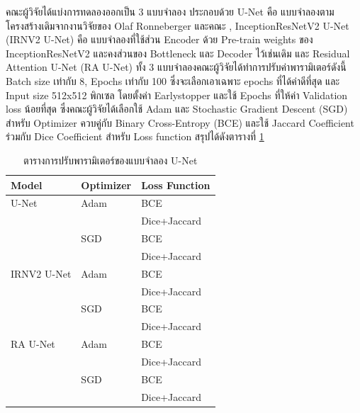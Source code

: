 \documentclass[12pt,oneside,openright,a4paper]{cpe-thai-project}
\begin{document}
\begin{itemize}[listparindent=\parindent]
คณะผู้วิจัยได้แบ่งการทดลองออกเป็น 3 แบบจำลอง ประกอบด้วย U-Net คือ แบบจำลองตามโครงสร้างเดิมจากงานวิจัยของ Olaf Ronneberger และคณะ \cite{unet-model}, InceptionResNetV2 U-Net (IRNV2 U-Net) คือ แบบจำลองที่ใช้ส่วน Encoder ด้วย Pre-train weights ของ InceptionResNetV2 และคงส่วนของ Bottleneck และ Decoder ไว้เช่นเดิม และ Residual Attention U-Net (RA U-Net) ทั้ง 3 แบบจำลองคณะผู้วิจัยได้ทำการปรับค่าพารามิเตอร์ดังนี้ Batch size เท่ากับ 8, Epochs เท่ากับ 100 ซึ่งจะเลือกเอาเฉพาะ epochs ที่ได้ค่าดีที่สุด และ Input size 512x512 พิกเซล โดยตั้งค่า Earlystopper และใช้ Epochs ที่ให้ค่า Validation loss น้อยที่สุด ซึ่งคณะผู้วิจัยได้เลือกใช้ Adam และ Stochastic Gradient Descent (SGD) สำหรับ Optimizer ควบคู่กับ Binary Cross-Entropy (BCE) และใช้ Jaccard Coefficient ร่วมกับ Dice Coefficient สำหรับ Loss function สรุปได้ดังตารางที่ \ref{tab:unetconf}

\begin{table}[!h]
    \centering
    \caption{ตารางการปรับพารามิเตอร์ของแบบจำลอง U-Net}
    \label{tab:unetconf}
    \begin{tabular}{>{\centering}p{}>{\centering}p{}>{\centering\arraybackslash}p{}}
\toprule
Model  & Optimizer & Loss Function\\ \midrule
 U-Net & Adam  & BCE  \\
 &  & Dice+Jaccard  \\
 & SGD & BCE  \\ 
 &  & Dice+Jaccard  \\ 
IRNV2 U-Net & Adam & BCE  \\ 
 &  & Dice+Jaccard  \\
 & SGD & BCE  \\ 
 &  & Dice+Jaccard  \\ 
 RA U-Net & Adam & BCE  \\ 
 &  & Dice+Jaccard  \\
 & SGD & BCE  \\ 
 &  & Dice+Jaccard  \\  \bottomrule
    \end{tabular}
\end{table}


\end{itemize}
\end{document}
